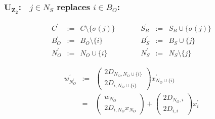 \documentclass[a4paper]{article}
\begin{document}
\subsubsection{$\mathbf{U_{Z_{2}}}$:$\quad j \in N_{S}$ replaces $i \in B_{O}$:}
\begin{equation}
\label{update:s_z_rep_o}
\begin{array}{ccccccc}
C^{\prime}      &:=&  C \setminus \{\sigma(j)\}
&\quad\quad&
S_{B}^{\prime}  &:=&  S_{B} \cup  \{\sigma(j)\}   \\
B_{O}^{\prime}  &:=&  B_{O} \setminus \{i\}
&\quad\quad&
B_{S}^{\prime}  &:=&  B_{S} \cup \{j\} \\
N_{O}^{\prime}  &:=&  N_{O} \cup \{i\}
&\quad\quad&
N_{S}^{\prime}  &:=&  N_{S} \setminus \{j\}
\end{array}
\end{equation}

\begin{eqnarray}
w_{N_{O}^{\prime}}^{\prime}
&:=&
\left(
\begin{array}{c}
2D_{N_{O}, N_{O} \cup \{i\}} \\
\hline
2D_{i, N_{O} \cup \{i\}}
\end{array}
\right)
x_{N_{O} \cup \{i\}}^{\prime}
\nonumber \\
&=&
\left(
\begin{array}{c}
w_{N_{O}} \\
\hline
2D_{i, N_{O}}x_{N_{O}}
\end{array}
\right)
+
\left(
\begin{array}{c}
2D_{N_{O}, i} \\
\hline
2D_{i,i}
\end{array}
\right)
x_{i}^{\prime}
\end{eqnarray}
\end{document}
